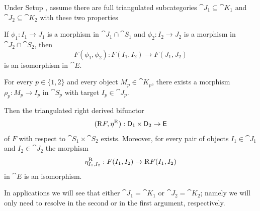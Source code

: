 \begin{thm} \label{thm:2000}
Under Setup \tup{\ref{set:1976}}, 
assume there are full triangulated subcategories 
$\cat{J}_1 \subseteq \cat{K}_1$ and 
$\cat{J}_2 \subseteq \cat{K}_2$
with these two properties\tup{:}
\begin{enumerate}
If $\phi_1 : I_1 \to J_1$ is a morphism in $\cat{J}_1 \cap \cat{S}_1$
and $\phi_2 : I_2 \to J_2$ is a morphism in $\cat{J}_2 \cap \cat{S}_2$, 
then 
\[ F(\phi_1, \phi_2) : F(I_1, I_2) \to F(J_1, J_2) \]
is an isomorphism in $\cat{E}$.
 
 For every $p \in \{1, 2\}$ and every object $M_p \in \cat{K}_p$,
there exists a morphism $\rho_p : M_p \to I_p$ in $\cat{S}_p$ with target 
$I_p \in \cat{J}_p$. 
\end{enumerate}
Then the triangulated right derived bifunctor%
\[ (\mathrm{R} F, \eta^{\mathrm{R}}) : \operatorname{\mathsf{D}}_1 \times \operatorname{\mathsf{D}}_2 \to \operatorname{\mathsf{E}} \]
of $F$ with respect to $\cat{S}_1 \times \cat{S}_2$
exists. Moreover, for every pair of objects $I_1 \in \cat{J}_1$ and 
$I_2 \in \cat{J}_2$ the morphism  
\[ \eta^{\mathrm{R}}_{I_1, I_2} : F(I_1, I_2) \to \mathrm{R} F (I_1, I_2) \]
in $\cat{E}$ is an isomorphism.
\end{thm}

In applications we will see that either $\cat{J}_1 = \cat{K}_1$ or 
$\cat{J}_2 = \cat{K}_2$; namely we will only need to resolve in the second or 
in the first argument, respectively. 

